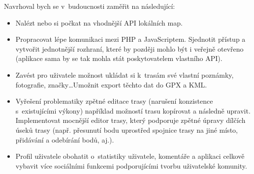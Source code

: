 Navrhoval bych se v~budoucnosti zaměřit na následující:

\begin{itemize}
  \item Nalézt nebo si počkat na vhodnější API lokálních map.
  \item Propracovat lépe komunikaci mezi PHP a JavaScriptem.
  Sjednotit přístup a vytvořit jednotnější rozhraní, které by později
  mohlo být i veřejně otevřeno (aplikace sama by se tak mohla stát
  poskytovatelem vlastního API).
  \item Zavést pro uživatele možnost ukládat si k~trasám své vlastní
  poznámky, fotografie, značky\ldots Umožnit export těchto dat do GPX
  a KML.
  \item Vyřešení problematiky zpětné editace trasy (narušení
  konzistence s~existujícími výkony) například možností trasu
  kopírovat a následně upravit. Implementovat mocnější editor trasy,
  který podporuje zpětné úpravy dílčích úseků trasy (např. přesunutí
  bodu uprostřed spojnice trasy na jiné místo, přidávání a odebírání
  bodů, aj.).
  \item Profil uživatele obohatit o~statistiky uživatele, komentáře a
  aplikaci celkově vybavit více sociálními funkcemi podporujícími
  tvorbu uživatelské komunity.
\end{itemize}

